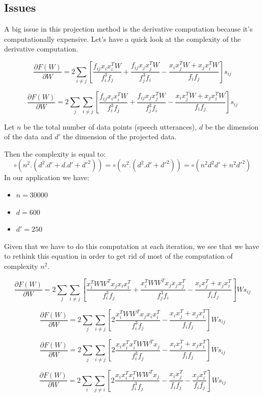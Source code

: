 \documentclass{techrep} %
\begin{document}
\subsection{Issues}

A big issue in this projection method is the derivative computation
because it's computationally expensive.
Let's have a quick look at the complexity of the derivative computation.

$$\frac{\partial{F(W)}}{\partial{W}} =
2\sum_{i\neq{}j}\left[\frac{f_{ij}x_ix_i^TW}{f_i^3f_j} +
  \frac{f_{ij}x_jx_j^TW}{f_j^3f_i} - \frac{x_ix_j^TW + x_jx_i^TW}{f_if_j}\right]s_{ij}$$

$$\frac{\partial{F(W)}}{\partial{W}} =
2\sum_{j}\sum_{i\neq{}j}\left[\frac{f_{ij}x_ix_i^TW}{f_i^3f_j} +
  \frac{f_{ij}x_jx_j^TW}{f_j^3f_i} - \frac{x_ix_j^TW + x_jx_i^TW}{f_if_j}\right]s_{ij}$$

Let $n$ be the total number of data points (speech utterances), $d$ be
the dimension of the data and $d'$ the dimension of the projected
data.

Then the complexity is equal to:
$$\circ{(n^2.(d^2.d'+d.d'+d'^2))} = \circ{(n^2.(d^2.d'+d'^2))} = \circ{(n^2d^2d'+n^2d'^2)}$$
In our application we have:
\begin{itemize}
  \item $n = 30000$
  \item $d = 600$
  \item $d' = 250$
\end{itemize}

Given that we have to do this computation at each iteration, we see
that we have to rethink this equation in order to get rid of most of
the computation of complexity $n^2$.

$$\frac{\partial{F(W)}}{\partial{W}} =
2\sum_{j}\sum_{i\neq{}j}\left[\frac{x_i^TWW^Tx_jx_ix_i^T}{f_i^3f_j} +
  \frac{x_i^TWW^Tx_jx_jx_j^T}{f_j^3f_i} - \frac{x_ix_j^T + x_jx_i^T}{f_if_j}\right]Ws_{ij}$$

$$\frac{\partial{F(W)}}{\partial{W}} =
2\sum_{j}\sum_{i\neq{}j}\left[2\frac{x_i^TWW^Tx_jx_ix_i^T}{f_i^3f_j}
   - \frac{x_ix_j^T + x_jx_i^T}{f_if_j}\right]Ws_{ij}$$

$$\frac{\partial{F(W)}}{\partial{W}} =
2\sum_{j}\sum_{i\neq{}j}\left[2\frac{x_ix_i^Tx_i^TWW^Tx_j}{f_i^3f_j}
   - \frac{x_ix_j^T + x_jx_i^T}{f_if_j}\right]Ws_{ij}$$

$$\frac{\partial{F(W)}}{\partial{W}} =
2\sum_{i}\sum_{j\neq{}i}\left[2\frac{x_ix_i^Tx_i^TWW^Tx_j}{f_i^3f_j}
   - \frac{x_ix_j^T}{f_if_j} - \frac{x_jx_i^T}{f_if_j}\right]Ws_{ij}$$
\end{document}
